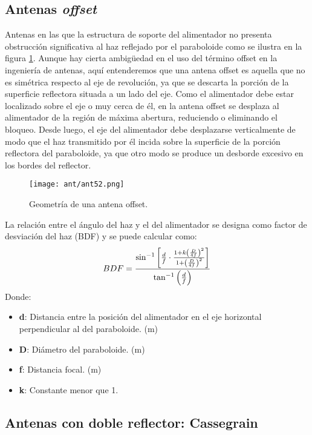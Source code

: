\documentclass[
	12pt, %
	fleqn, %
	a4paper, %
	oneside, %
]{LegrandOrangeBook}
\begin{document}
\subsection{Antenas \textit{offset}}
Antenas en las que la estructura de soporte del alimentador no presenta obstrucción significativa al haz reflejado por el paraboloide como se ilustra en la figura \ref{fig:geo antena offset}. Aunque hay cierta ambigüedad en el uso del término offset en la ingeniería de antenas, aquí entenderemos que una antena offset es aquella que no es simétrica respecto al eje de revolución, ya que se descarta la porción de la superficie reflectora situada a un lado del eje. Como el alimentador debe estar localizado sobre el eje o muy cerca de él, en la antena offset se desplaza al alimentador de la región de máxima abertura, reduciendo o eliminando el bloqueo. Desde luego, el eje del alimentador debe desplazarse verticalmente de modo que el haz transmitido por él incida sobre la superficie de la porción reflectora del paraboloide, ya que otro modo se produce un desborde excesivo en los bordes del reflector.
\begin{figure}[H]
\centering
\texttt{[image: ant/ant52.png]}
\caption{Geometría de una antena offset.}
\label{fig:geo antena offset}
\end{figure}
\begin{definition}[BDF]
La relación entre el ángulo del haz y el del alimentador se designa como factor de desviación del haz (BDF) y se puede calcular como:
\begin{equation}
BDF=\frac{\sin^{-1}\left[\frac{d}{f}\cdot\frac{1+k\left(\frac{D}{4f}\right)^2}{1+\left(\frac{D}{4f}\right)^2}\right]}{\tan^{-1}\left(\frac{d}{f}\right)}
\end{equation}
Donde:
\begin{itemize}
\item \textbf{d}: Distancia entre la posición del alimentador en el eje horizontal perpendicular al del paraboloide. (m)
\item \textbf{D}: Diámetro del paraboloide. (m)
\item \textbf{f}: Distancia focal. (m)
\item \textbf{k}: Constante menor que 1.
\end{itemize}
\end{definition}
\subsection{Antenas con doble reflector: Cassegrain}
\end{document}
